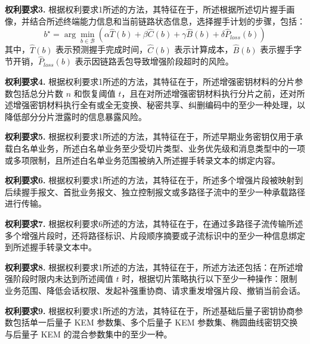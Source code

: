 \documentclass[12pt,a4paper]{article}
\begin{document}
\vspace{0.5cm}

\textbf{权利要求3.} 根据权利要求1所述的方法，其特征在于，所述根据所述切片握手画像，并结合所述终端能力信息和当前链路状态信息，选择握手计划的步骤，包括：
\[
b^\star=\arg\min_{b \in \mathcal{B}} \left(\alpha \hat{T}(b)+\beta \hat{C}(b)+\gamma \hat{B}(b)+\delta \hat{P}_{loss}(b)\right)
\]
其中，$\hat{T}(b)$ 表示预测握手完成时间，$\hat{C}(b)$ 表示计算成本，$\hat{B}(b)$ 表示握手字节开销，$\hat{P}_{loss}(b)$ 表示因链路丢包导致增强阶段超时的风险。

\vspace{0.5cm}

\textbf{权利要求4.} 根据权利要求1所述的方法，其特征在于，所述增强密钥材料的分片参数包括总分片数 $n$ 和恢复阈值 $t$，且在对所述增强密钥材料执行分片之前，还对所述增强密钥材料执行全有或全无变换、秘密共享、纠删编码中的至少一种处理，以降低部分分片泄露时的信息暴露风险。

\vspace{0.5cm}

\textbf{权利要求5.} 根据权利要求1所述的方法，其特征在于，所述早期业务密钥仅用于承载白名单业务，所述白名单业务至少受切片类型、业务优先级和消息类型中的一项或多项限制，且所述白名单业务范围被纳入所述握手转录文本的绑定内容。

\vspace{0.5cm}

\textbf{权利要求6.} 根据权利要求1所述的方法，其特征在于，所述多个增强片段被映射到后续握手报文、首批业务报文、独立控制报文或多路径子流中的至少一种承载路径进行传输。

\vspace{0.5cm}

\textbf{权利要求7.} 根据权利要求6所述的方法，其特征在于，在通过多路径子流传输所述多个增强片段时，还将路径标识、片段顺序摘要或子流标识中的至少一种信息绑定到所述握手转录文本中。

\vspace{0.5cm}

\textbf{权利要求8.} 根据权利要求1所述的方法，其特征在于，所述方法还包括：在所述增强阶段时限内未达到所述阈值 $t$ 时，根据切片策略执行以下至少一种操作：限制业务范围、降低会话权限、发起补强重协商、请求重发增强片段、撤销当前会话。

\vspace{0.5cm}

\textbf{权利要求9.} 根据权利要求1所述的方法，其特征在于，所述基础后量子密钥协商参数包括单一后量子 KEM 参数集、多个后量子 KEM 参数集、椭圆曲线密钥交换与后量子 KEM 的混合参数集中的至少一种。
\end{document}
